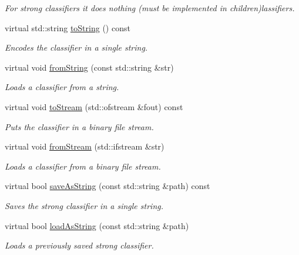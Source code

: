 \begin{DoxyCompactItemize}
\begin{DoxyCompactList}\small\item\em For strong classifiers it does nothing (must be implemented in children)lassifiers. \end{DoxyCompactList}\item 
virtual std\+::string \hyperlink{classiCub_1_1boostMIL_1_1StrongClassifier_adb838aab38a5503330b4335c2b4d7a0f}{to\+String} () const 
\begin{DoxyCompactList}\small\item\em Encodes the classifier in a single string. \end{DoxyCompactList}\item 
virtual void \hyperlink{classiCub_1_1boostMIL_1_1StrongClassifier_abdfebbfe702c289e2841a26835e8d46f}{from\+String} (const std\+::string \&str)
\begin{DoxyCompactList}\small\item\em Loads a classifier from a string. \end{DoxyCompactList}\item 
virtual void \hyperlink{classiCub_1_1boostMIL_1_1StrongClassifier_a5f8724e7d8cffd11e4128087c4c18412}{to\+Stream} (std\+::ofstream \&fout) const 
\begin{DoxyCompactList}\small\item\em Puts the classifier in a binary file stream. \end{DoxyCompactList}\item 
virtual void \hyperlink{classiCub_1_1boostMIL_1_1StrongClassifier_a64bcbc003a3fcde2bd8f20cc98f4d71b}{from\+Stream} (std\+::ifstream \&str)
\begin{DoxyCompactList}\small\item\em Loads a classifier from a binary file stream. \end{DoxyCompactList}\item 
virtual bool \hyperlink{classiCub_1_1boostMIL_1_1StrongClassifier_ab92075af6f373b770f723e1289fca780}{save\+As\+String} (const std\+::string \&path) const 
\begin{DoxyCompactList}\small\item\em Saves the strong classifier in a single string. \end{DoxyCompactList}\item 
virtual bool \hyperlink{classiCub_1_1boostMIL_1_1StrongClassifier_aa3dafb8b823e28e200ce97ec81676667}{load\+As\+String} (const std\+::string \&path)
\begin{DoxyCompactList}\small\item\em Loads a previously saved strong classifier. \end{DoxyCompactList}\item 

\end{DoxyCompactItemize}
